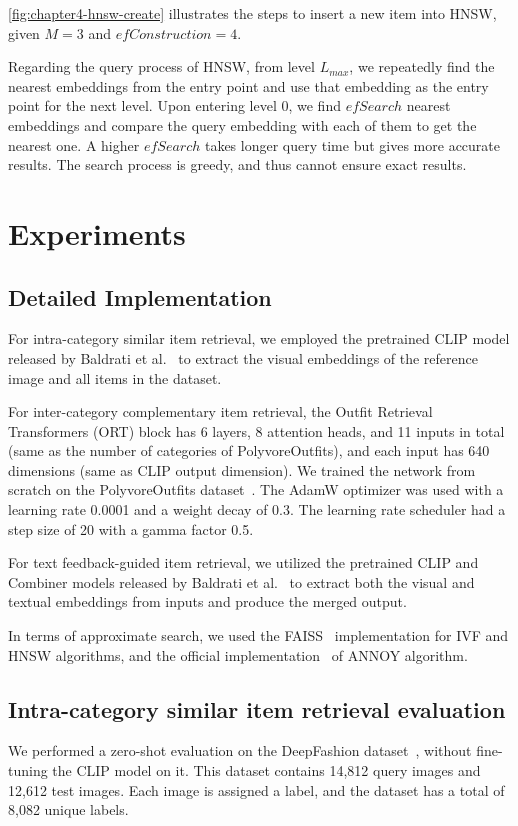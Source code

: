 \autoref{fig:chapter4-hnsw-create} illustrates the steps to insert a new item into HNSW, given $M = 3$ and $efConstruction = 4$. 

Regarding the query process of HNSW, from level $L_{max}$, we repeatedly find the nearest embeddings from the entry point and use that embedding as the entry point for the next level. Upon entering level 0, we find $efSearch$ nearest embeddings and compare the query embedding with each of them to get the nearest one. A higher $efSearch$ takes longer query time but gives more accurate results. The search process is greedy, and thus cannot ensure exact results.

\section{Experiments}
\subsection{Detailed Implementation}

For intra-category similar item retrieval, we employed the pretrained CLIP model released by Baldrati et al.~\cite{Baldrati-CVPR2022-Conditioned} to extract the visual embeddings of the reference image and all items in the dataset.

For inter-category complementary item retrieval, the Outfit Retrieval Transformers (ORT) block has 6 layers, 8 attention heads, and 11 inputs in total (same as the number of categories of PolyvoreOutfits), and each input has 640 dimensions (same as CLIP output dimension). We trained the network from scratch on the PolyvoreOutfits dataset~\cite{Mariya-ECCV18-Learning}. The AdamW optimizer was used with a learning rate 0.0001 and a weight decay of 0.3. The learning rate scheduler had a step size of 20 with a gamma factor 0.5. 

For text feedback-guided item retrieval, we utilized the pretrained CLIP and Combiner models released by Baldrati et al.~\cite{Baldrati-CVPR2022-Conditioned} to extract both the visual and textual embeddings from inputs and produce the merged output.

In terms of approximate search, we used the FAISS~\cite{johnson-bigdata2019-faiss} implementation for IVF and HNSW algorithms, and the official implementation~\cite{Erik-Github-Annoy} of ANNOY algorithm. 

\subsection{Intra-category similar item retrieval evaluation}
We performed a zero-shot evaluation on the DeepFashion dataset~\cite{Liu-CVPR2016-DeepFashion}, without fine-tuning the CLIP model on it.
This dataset contains 14,812 query images and 12,612 test images. Each image is assigned a label, and the dataset has a total of 8,082 unique labels.

